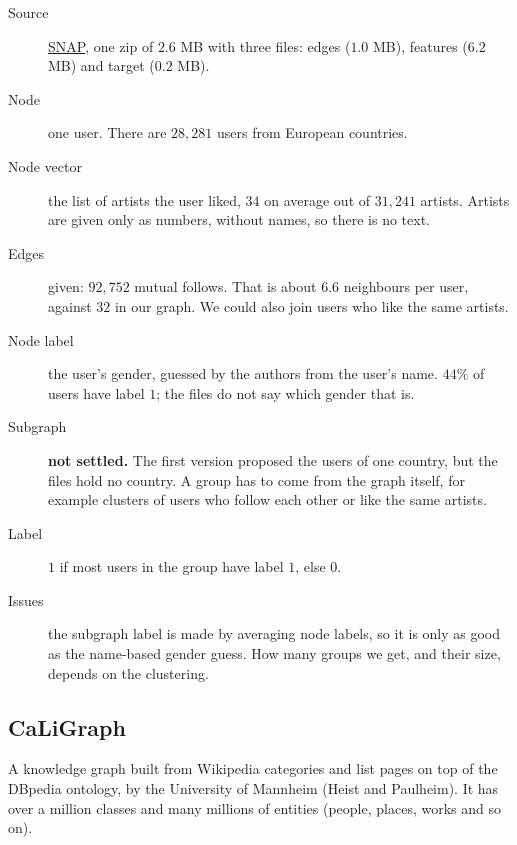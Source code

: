 \documentclass[11pt]{article}
\begin{document}
\begin{description}
\item[Source] \href{https://snap.stanford.edu/data/feather-deezer-social.html}{SNAP}, one zip of
$2.6$ MB with three files: edges ($1.0$ MB), features ($6.2$ MB) and target ($0.2$ MB).
\item[Node] one user. There are $28{,}281$ users from European countries.
\item[Node vector] the list of artists the user liked, $34$ on average out of $31{,}241$ artists.
Artists are given only as numbers, without names, so there is no text.
\item[Edges] given: $92{,}752$ mutual follows. That is about $6.6$ neighbours per user, against
$32$ in our graph. We could also join users who like the same artists.
\item[Node label] the user's gender, guessed by the authors from the user's name. $44\%$ of users
have label $1$; the files do not say which gender that is.
\item[Subgraph] \textbf{not settled.} The first version proposed the users of one country, but
the files hold no country. A group has to come from the graph itself, for example clusters of
users who follow each other or like the same artists.
\item[Label] $1$ if most users in the group have label $1$, else $0$.
\item[Issues] the subgraph label is made by averaging node labels, so it is only as good as the
name-based gender guess. How many groups we get, and their size, depends on the clustering.
\end{description}

\subsection*{CaLiGraph}

A knowledge graph built from Wikipedia categories and list pages on top of the DBpedia
ontology, by the University of Mannheim (Heist and Paulheim). It has over a million classes and
many millions of entities (people, places, works and so on).
\end{document}
